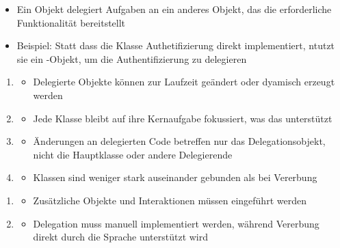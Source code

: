\begin{infoBox}[title=Delegation]
    \begin{itemize}
        \item Ein Objekt delegiert Aufgaben an ein anderes Objekt, das die erforderliche Funktionalität bereitstellt
        \item Beispiel: Statt dass die Klasse  Authetifizierung direkt implementiert, ntutzt sie ein -Objekt, um die Authentifizierung zu delegieren
    \end{itemize}
    \begin{enumerate}
        \item {}
        \begin{itemize}
            \item Delegierte Objekte können zur Laufzeit geändert oder dyamisch erzeugt werden
        \end{itemize}
        \item {}
        \begin{itemize}
            \item Jede Klasse bleibt auf ihre Kernaufgabe fokussiert, was das  unterstützt
        \end{itemize}
        \item {}
        \begin{itemize}
            \item Änderungen an delegierten Code betreffen nur das Delegationsobjekt, nicht die Hauptklasse oder andere Delegierende
        \end{itemize}
        \item {}
        \begin{itemize}
            \item Klassen sind weniger stark auseinander gebunden als bei Vererbung
        \end{itemize}
    \end{enumerate}
    \begin{enumerate}
        \item {}
        \begin{itemize}
            \item Zusätzliche Objekte und Interaktionen müssen eingeführt werden
        \end{itemize}
        \item {}
        \begin{itemize}
            \item Delegation muss manuell implementiert werden, während Vererbung direkt durch die Sprache unterstützt wird
        \end{itemize}
    \end{enumerate}
\end{infoBox}
